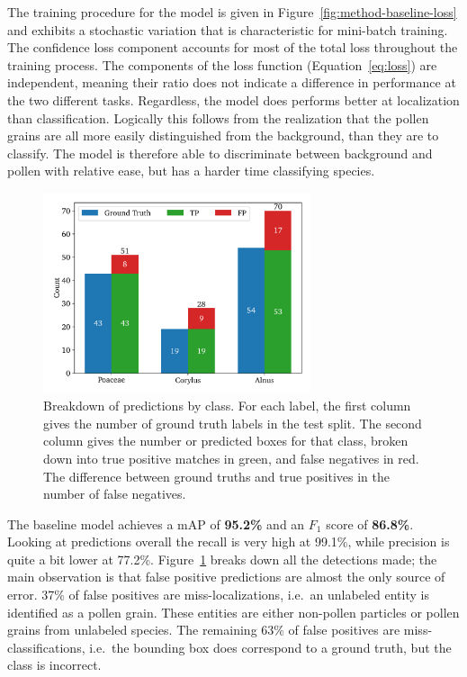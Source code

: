 The training procedure for the model is given in Figure~\ref{fig:method-baseline-loss} and exhibits a stochastic variation that is characteristic for mini-batch training.
The confidence loss component accounts for most of the total loss throughout the training process.
The components of the loss function (Equation~\ref{eq:loss}) are independent, meaning their ratio does not indicate a difference in performance at the two different tasks.
Regardless, the model does performs better at localization than classification.
Logically this follows from the realization that the pollen grains are all more easily distinguished from the background, than they are to classify.
The model is therefore able to discriminate between background and pollen with relative ease, but has a harder time classifying species.

\begin{figure}[htbp]
    \centering
    \includegraphics[width=0.7\textwidth]{figs/results/baseline/detections_test.pdf}
    \caption[Detections by type by class for the baseline on the test split]{%
Breakdown of predictions by class.
For each label, the first column gives the number of ground truth labels in the test split.
The second column gives the number or predicted boxes for that class, broken down into true positive matches in green, and false negatives in red.
The difference between ground truths and true positives in the number of false negatives.
    }\label{fig:results-baseline-detections}
  \end{figure}

The baseline model achieves a mAP of \textbf{95.2\%} and an \(F_1\) score of \textbf{86.8\%}.
Looking at predictions overall the recall is very high at 99.1\%, while precision is quite a bit lower at 77.2\%.
Figure~\ref{fig:results-baseline-detections} breaks down all the detections made; the main observation is that false positive predictions are almost the only source of error.
37\% of false positives are miss-localizations, i.e.\ an unlabeled entity is identified as a pollen grain.
These entities are either non-pollen particles or pollen grains from unlabeled species.
The remaining 63\% of false positives are miss-classifications, i.e.\ the bounding box does correspond to a ground truth, but the class is incorrect.

